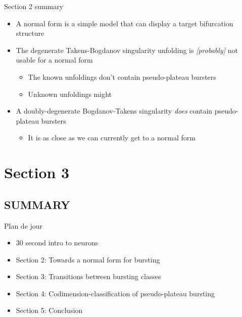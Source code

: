 \documentclass[presentation]{beamer}
\begin{document}
\begin{frame}[label={sec:org18ffff9}]{Section 2 summary}
\begin{itemize}[<+->]
\item A normal form is a simple model that can display a target bifurcation structure
\item The degenerate Takens-Bogdanov singularity unfolding is \emph{[probably]} not usable for a normal form
\begin{itemize}
\item The known unfoldings don't contain pseudo-plateau bursters
\item Unknown unfoldings might
\end{itemize}
\item A doubly-degenerate Bogdanov-Takens singularity \emph{does} contain pseudo-plateau bursters
\begin{itemize}
\item It is as close as we can currently get to a normal form
\end{itemize}
\end{itemize}
\end{frame}

\section{Section 3}
\label{sec:org90ed8ef}
\subsection{SUMMARY}
\label{sec:orgf235a78}
\begin{frame}[label={sec:orgd22f519}]{Plan de jour}
\begin{itemize}
\item 30 second intro to neurons
\item Section 2: Towards a normal form for bursting
\item \alert{Section 3: Transitions between bursting classes}
\item Section 4: Codimension-classification of pseudo-plateau bursting
\item Section 5: Conclusion
\end{itemize}
\end{frame}
\end{document}
